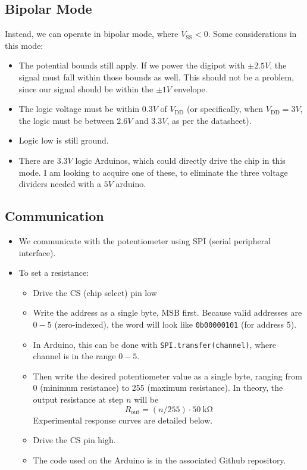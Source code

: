 \documentclass[fleqn]{article}
\begin{document}
    \subsection*{Bipolar Mode}
         Instead, we can operate in bipolar mode, where $V_{\text{SS}} < 0$. Some considerations in this mode:
        \begin{itemize}
            \item The potential bounds still apply. If we power the digipot with $\pm 2.5V$, the signal must fall within those bounds as well. This should not be a problem, since our signal should be within the $\pm1V$ envelope.
            \item The logic voltage must be within $0.3V$ of $V_\text{DD}$ (or specifically, when $V_\text{DD} = 3V$, the logic must be between $2.6V$ and $3.3V$, as per the datasheet).
            \item Logic low is still ground.
            \item There are $3.3V$ logic Arduinos, which could directly drive the chip in this mode. I am looking to acquire one of these, to eliminate the three voltage dividers needed with a $5V$ arduino.
        \end{itemize}
    \subsection*{Communication}
        \begin{itemize}
            \item We communicate with the potentiometer using SPI (serial peripheral interface).
            \item To set a resistance:
            \begin{itemize}
                \item Drive the CS (chip select) pin low
                \item Write the address as a single byte, MSB first. Because valid addresses are $0-5$ (zero-indexed), the word will look like \texttt{0b00000101} (for address 5).
                \item In Arduino, this can be done with \texttt{SPI.transfer(channel)}, where channel is in the range $0-5$.
                \item Then write the desired potentiometer value as a single byte, ranging from 0 (minimum resistance) to 255 (maximum resistance). In theory, the output resistance at step $n$ will be
                \begin{equation*}
                    R_\text{out} = (n/255)\cdot \SI{50}{\kilo\ohm}
                \end{equation*}
                Experimental response curves are detailed below.
                \item Drive the CS pin high.
                \item The code used on the Arduino is in the associated Github repository.
            \end{itemize}
        \end{itemize}
\end{document}
